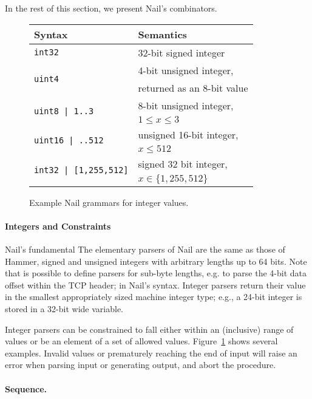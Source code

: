 \noindent
In the rest of this section, we present Nail's combinators.

\begin{figure}[tb]
\begin{tabular}{ll}
\toprule
\bf Syntax & \bf Semantics \\
\midrule
\texttt{int32} & 32-bit signed integer \\
\multirow{2}{*}{\texttt{uint4}}
  & 4-bit unsigned integer, \\
  & returned as an 8-bit value \\
\multirow{2}{*}{\texttt{uint8 | 1..3}}
  & 8-bit unsigned integer, \\
  & $1\leq x \leq 3$ \\
\multirow{2}{*}{\texttt{uint16 | ..512}}
  & unsigned 16-bit integer, \\
  & $x \leq 512$ \\
\multirow{2}{*}{\texttt{int32 | [1,255,512]}}
  & signed 32 bit integer, \\
  & $x \in \{ 1, 255, 512 \}$ \\
\bottomrule
\end{tabular}
\caption{Example Nail grammars for integer values.}
\label{fig:range}
\end{figure}

\paragraph{Integers and Constraints}
Nail's fundamental 
The elementary parsers of Nail are the same as those of Hammer, signed
and unsigned integers with arbitrary lengths up to 64 bits.  Note that is
possible to define parsers for sub-byte lengths, e.g. to parse the 4-bit
data offset within the TCP header; in Nail's syntax.  Integer parsers
return their value in the smallest appropriately sized machine integer
type; e.g., a 24-bit integer is stored in a 32-bit wide variable.

Integer parsers can be constrained to fall either within an (inclusive)
range of values or be an element of a set of allowed values.
Figure~\ref{fig:range} shows several examples.
Invalid values or prematurely reaching the end of input will raise an
error when parsing input or generating output, and abort the procedure.


\paragraph{Sequence.}

